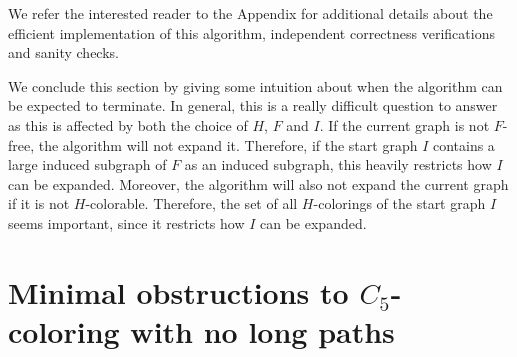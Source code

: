 \documentclass[11pt,a4paper]{article}
\theoremstyle{mystyle}
\newcommand{\hull}{\mathsf{hull}}
\begin{document}


We refer the interested reader to the Appendix for additional details about the efficient implementation of this algorithm, independent correctness verifications and sanity checks.

We conclude this section by giving some intuition about when the algorithm can be expected to terminate. In general, this is a really difficult question to answer as this is affected by both the choice of $H$, $F$ and $I$. If the current graph is not $F$-free, the algorithm will not expand it. Therefore, if the start graph $I$ contains a large induced subgraph of $F$ as an induced subgraph, this heavily restricts how $I$ can be expanded. Moreover, the algorithm will also not expand the current graph if it is not $H$-colorable. Therefore, the set of all $H$-colorings of the start graph $I$ seems important, since it restricts how $I$ can be expanded.

\section{Minimal obstructions to $C_5$-coloring with no long paths}\label{sec:finite}
\end{document}
